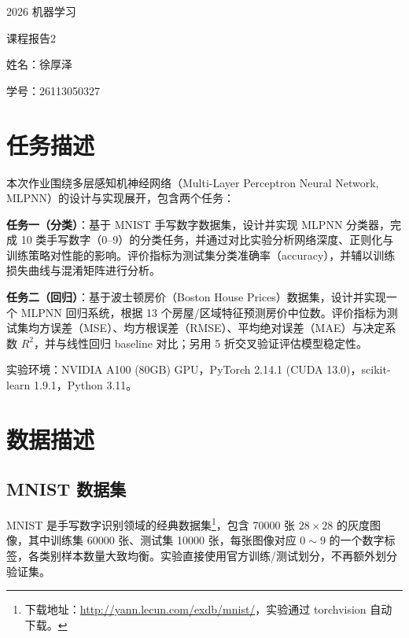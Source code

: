 \documentclass[UTF8,zihao=-4]{ctexart}
\newcommand{\ReportCourse}{2026 机器学习}
\newcommand{\ReportNo}{2}
\newcommand{\ReportName}{徐厚泽}
\newcommand{\ReportStudentID}{26113050327}
\begin{document}
\begin{titlepage}
  \centering
  \vspace*{1.2cm}
  {\heiti{}\ReportCourse\par}
  \vspace{1.5em}
  {\heiti{}课程报告\ReportNo\par}
  \vfill
  {\kaishu{}姓名：\ReportName\par}
  \vspace{0.8em}
  {\kaishu{}学号：\ReportStudentID\par}
  \vfill
\end{titlepage}

\section{任务描述}
本次作业围绕多层感知机神经网络（Multi-Layer Perceptron Neural Network, MLPNN）的设计与实现展开，包含两个任务：

\textbf{任务一（分类）}：基于 MNIST 手写数字数据集，设计并实现 MLPNN 分类器，完成 10 类手写数字（0--9）的分类任务，并通过对比实验分析网络深度、正则化与训练策略对性能的影响。评价指标为测试集分类准确率（accuracy），并辅以训练损失曲线与混淆矩阵进行分析。

\textbf{任务二（回归）}：基于波士顿房价（Boston House Prices）数据集，设计并实现一个 MLPNN 回归系统，根据 13 个房屋/区域特征预测房价中位数。评价指标为测试集均方误差（MSE）、均方根误差（RMSE）、平均绝对误差（MAE）与决定系数 $R^2$，并与线性回归 baseline 对比；另用 5 折交叉验证评估模型稳定性。

实验环境：NVIDIA A100 (80GB) GPU，PyTorch 2.14.1 (CUDA 13.0)，scikit-learn 1.9.1，Python 3.11。

\section{数据描述}
\subsection{MNIST 数据集}
MNIST 是手写数字识别领域的经典数据集\footnote{下载地址：\url{http://yann.lecun.com/exdb/mnist/}，实验通过 torchvision 自动下载。}，包含 70000 张 $28\times 28$ 的灰度图像，其中训练集 60000 张、测试集 10000 张，每张图像对应 $0\sim 9$ 的一个数字标签，各类别样本数量大致均衡。实验直接使用官方训练/测试划分，不再额外划分验证集。
\end{document}

